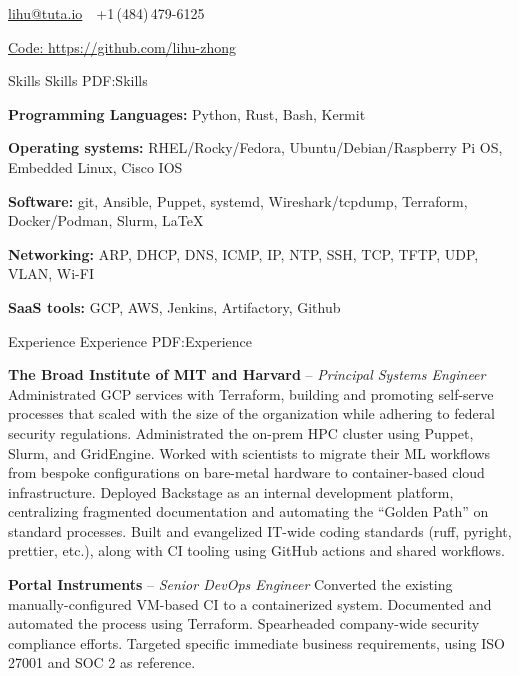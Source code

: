 \documentclass[letterpaper,MMMyyyy,nonstopmode]{simpleresumecv}
\newcommand{\CVAuthor}{Lihu Zhong}
\begin{document}
\Title{\CVAuthor}

\begin{SubTitle}
\href{mailto:lihu@tuta.io}
{lihu@tuta.io}
\,\SubBulletSymbol\,
+1\,(484)\,479-6125
\par
\href{https://github.com/lihu-zhong}
{Code: \url{https://github.com/lihu-zhong}}
\end{SubTitle}

\begin{Body}

\Section
{Skills}
{Skills}
{PDF:Skills}
{\raggedright

\Entry
\textbf{Programming Languages: }
Python,
Rust,
Bash,
Kermit

\Entry
\textbf{Operating systems:}
RHEL/Rocky/Fedora,
Ubuntu/Debian/Raspberry Pi OS,
Embedded Linux,
Cisco IOS

\Entry
\textbf{Software: }
git,
Ansible,
Puppet,
systemd,
Wireshark/tcpdump,
Terraform,
Docker/Podman,
Slurm,
{\LaTeX}

\Entry
\textbf{Networking: }
ARP,
DHCP,
DNS,
ICMP,
IP,
NTP,
SSH,
TCP,
TFTP,
UDP,
VLAN,
Wi-FI

\Entry
\textbf{SaaS tools: }
GCP,
AWS,
Jenkins,
Artifactory,
Github

}

\Section
{Experience}
{Experience}
{PDF:Experience}

\Entry
\textbf{The Broad Institute of MIT and Harvard}
\hfill
{} --
\Gap
\textit{Principal Systems Engineer}
\Gap
\BulletItem
Administrated GCP services with Terraform, building and promoting self-serve
processes that scaled with the size of the organization while adhering to
federal security regulations.
\BulletItem
Administrated the on-prem HPC cluster using Puppet, Slurm, and GridEngine.
\BulletItem
Worked with scientists to migrate their ML workflows from bespoke configurations
on bare-metal hardware to container-based cloud infrastructure.
\BulletItem
Deployed Backstage as an internal development platform, centralizing fragmented
documentation and automating the ``Golden Path'' on standard processes.
\BulletItem
Built and evangelized IT-wide coding standards (ruff, pyright, prettier,
etc.), along with CI tooling using GitHub actions and shared workflows.

\BigGap

\Entry
\textbf{Portal Instruments}
\hfill
{} --
\Gap
\textit{Senior DevOps Engineer}
\Gap
\BulletItem
Converted the existing manually-configured VM-based CI to a containerized
system. Documented and automated the process using Terraform.
\BulletItem
Spearheaded company-wide security compliance efforts. Targeted specific
immediate business requirements, using ISO 27001 and SOC 2 as reference.


\end{Body}
\end{document}
